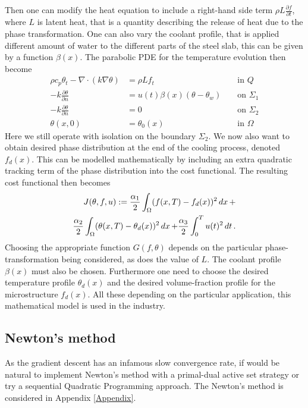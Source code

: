 Then one can modify the heat equation to include a right-hand side term $\rho L \frac{\partial f}{\partial t}$, where $L$ is latent heat, that is a quantity describing the release of heat due to the phase transformation. One can also vary the coolant profile, that is applied different amount of water to the different parts of the steel slab, this can be given by a function $\beta (x)$. The parabolic PDE for the temperature evolution then become 
\begin{align*}
    \rho c_p \theta_t - \nabla \cdot (k\nabla \theta) &= \rho L f_t  &&\textrm{ in } Q \\
    - k \frac{\partial \theta}{\partial n} &= u(t)\beta(x) \left(\theta - \theta_w \right) &&\textrm{ on }\Sigma_1 \\
    -k \frac{\partial \theta}{\partial n} &= 0 &&\textrm{ on } \Sigma_2 \\
    \theta(x,0) &= \theta_0(x) &&\textrm{ in } \Omega
\end{align*}
Here we still operate with isolation on the boundary $\Sigma_2$. We now also want to obtain desired phase distribution at the end of the cooling process, denoted $f_d(x)$. This can be modelled mathematically by including an extra quadratic tracking term of the phase distribution into the cost functional. The resulting cost functional then becomes
\begin{equation*}
\begin{aligned}
        J(\theta, f, u) := \frac{\alpha_1}{2}\int_{\Omega}(f(x,T)-f_d(x))^2\mathop{dx} + \\ \frac{\alpha_2}{2}\int_{\Omega}(\theta(x,T) - \theta_d(x))^2\mathop{dx}  + \frac{\alpha_3}{2}\int_0^Tu(t)^2 \mathop{dt}.
\end{aligned}
\end{equation*}
Choosing the appropriate function $G(f,\theta)$ depends on the particular phase-transformation being considered, as does the value of $L$. The coolant profile $\beta(x)$ must also be chosen. Furthermore one need to choose the desired temperature profile $\theta_d(x)$ and the desired volume-fraction profile for the microstructure $f_d(x)$. All these depending on the particular application, this mathematical model is used in the industry. 

\subsection{Newton's method}
 As the gradient descent has an infamous slow convergence rate, if would be natural to implement Newton's method with a primal-dual active set strategy or try a sequential Quadratic Programming approach. The Newton's method is considered in Appendix \ref{Appendix}. 